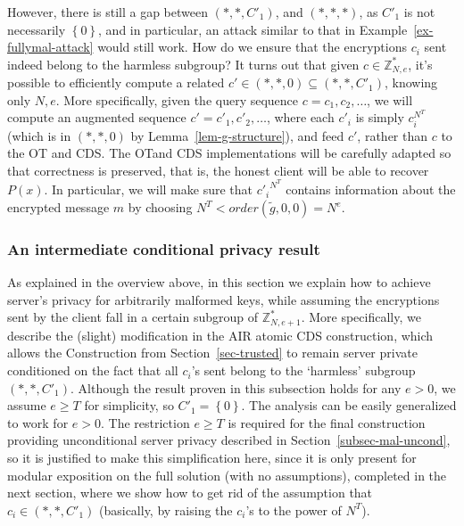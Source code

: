 \documentclass{article}
\newcommand{\set}[1]{\left\{#1\right\}}
\newcommand{\ot}{\mbox{OT}\;}
\newcommand{\U}[1]{\mathbb{Z}_{#1}^*}
\begin{document}
However, there is still a gap between
$(*,*,C'_1)$, and $(*,*,*)$, as $C'_1$ is not necessarily $\set{0}$, and
in particular, an attack similar to that in Example~\ref{ex-fullymal-attack} would still work.
How do we ensure that the encryptions $c_i$ sent indeed belong to the harmless
subgroup? %
It turns out that given $c\in \U{N,e}$, it's possible to efficiently compute a
related $c'\in (*,*,0)\subseteq(*,*,C'_1)$, knowing only $N,e$. More
specifically, given the query sequence $c=c_1,c_2,\ldots$, we will
compute an augmented sequence $c'=c'_1,c'_2,\ldots$, where each
$c'_i$ is simply $c^{N^T}_i$ (which is in $(*,*,0)$ by
Lemma~\ref{lem-g-structure}), and feed $c'$, rather than $c$ to the \ot
and CDS. The \ot and CDS implementations will be carefully adapted so
that correctness is preserved, that is, the honest client will be
able to recover $P(x)$. In particular, we will make sure that ${c'_i}^{N^T}$ contains information about the encrypted message $m$ by choosing $N^T<order(\tilde{g},0,0)=N^e$.
\subsubsection{An intermediate conditional privacy result}
\label{subsec-mal-cond}
As explained in the overview above, in this section we explain how to achieve server's privacy for arbitrarily malformed keys, while assuming
the encryptions sent by the client fall in a certain subgroup of $\U{N,e+1}$. 
More specifically, we describe the (slight) modification in the AIR atomic CDS construction, which allows the
Construction from Section~\ref{sec-trusted} to remain server private conditioned on the fact that all $c_i$'s sent belong to the `harmless' subgroup $(*,*,C'_1)$.
Although the result proven in this subsection holds for
any $e>0$, we assume $e\geq T$ for simplicity, so $C'_1=\set{0}$. The analysis can be easily generalized
to work for $e>0$. The restriction $e\geq T$ is required for the final construction providing unconditional server privacy described in Section~\ref{subsec-mal-uncond},
so it is justified to make this simplification here, since it is only present for modular exposition on the full solution (with no assumptions), completed
in the next section, where we show how to get rid of the assumption that $c_i\in (*,*,C'_1)$ (basically, by raising the $c_i$'s to the power of $N^T$).
\end{document}
